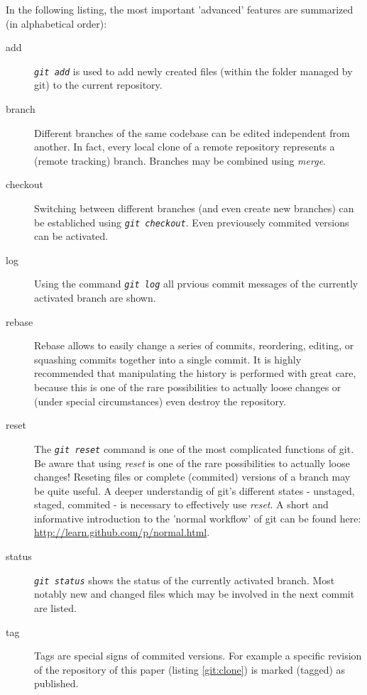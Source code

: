 \documentclass{ifacconf}
\begin{document}
In the following listing, the most important 'advanced' features are summarized
(in alphabetical order):
\begin{description}
\item [add] \textit{\lstinline!git add!} is used to add newly created files (within the  folder managed by git) to the current repository.
\item [{branch}] Different branches of the same codebase can be edited independent from
another. In fact, every local clone of a remote repository represents a (remote tracking) 
branch. Branches may be combined using \textit{merge}.
\item [checkout] Switching between different branches (and even create new branches) can
be establiched using \textit{\lstinline!git checkout!}. Even previousely commited versions
can be activated.
\item [log] Using the command \textit{\lstinline!git log!} all prvious commit messages of
the currently activated branch are shown.
\item [{rebase}] Rebase allows to easily change a series of commits, reordering, editing, or squashing commits together into a single commit. It is highly recommended that manipulating the history is performed with great care, because this is one of the rare possibilities to actually loose changes or (under special circumstances) even destroy the repository.
\item [reset] The \textit{\lstinline!git reset!} command is one of the most complicated
functions of git. Be aware that using \textit{reset} is one of the rare
possibilities to actually loose changes! Reseting files or complete (commited) versions
of a branch may be quite useful. A deeper understandig of git's different states -
unstaged, staged, commited - is necessary to effectively use \textit{reset}. A short
and informative introduction to the 'normal workflow' of git can be found here: \url{http://learn.github.com/p/normal.html}.
\item [status] \textit{\lstinline!git status!} shows the status of
the currently activated branch. Most notably new and changed files which may be involved
in the next commit are listed.
\item [tag] Tags are special signs of commited versions. For example a specific revision
of the repository of this paper (listing \ref{git:clone}) is marked (tagged) as published.
\end{description}
\end{document}
